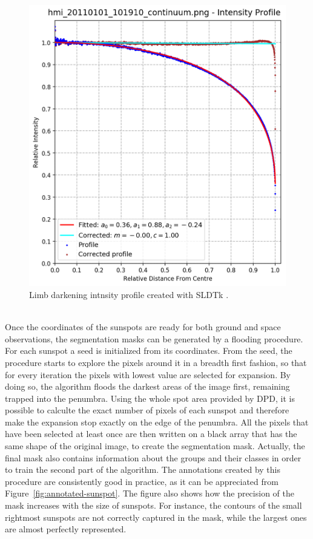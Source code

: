 \begin{figure}[t]
    \centering
    \includegraphics[width=\textwidth]{./pictures/SLDTk}
    \caption{Limb darkening intnsity profile created with SLDTk \cite{sldtk}.}
    \label{fig:sldtk}
\end{figure}\\
Once the coordinates of the sunspots are ready for both ground and space observations, the segmentation masks can be generated by a flooding procedure. For each sunspot a seed is initialized from its coordinates. From the seed, the procedure starts to explore the pixels around it in a breadth first fashion, so that for every iteration the pixels with lowest value are selected for expansion. By doing so, the algorithm floods the darkest areas of the image first, remaining trapped into the penumbra. Using the whole spot area provided by DPD, it is possible to calculte the exact number of pixels of each sunspot and therefore make the expansion stop exactly on the edge of the penumbra. All the pixels that have been selected at least once are then written on a black array that has the same shape of the original image, to create the segmentation mask. Actually, the final mask also contains information about the groups and their classes in order to train the second part of the algorithm. The annotations created by this procedure are consistently good in practice, as it can be appreciated from Figure~\ref{fig:annotated-sunspot}. The figure also shows how the precision of the mask increases with the size of sunspots. For instance, the contours of the small rightmost sunspots are not correctly captured in the mask, while the largest ones are almost perfectly represented.\\
